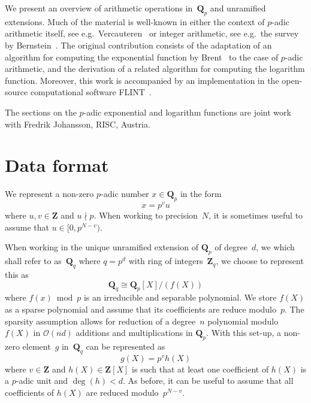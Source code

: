 We present an overview of arithmetic operations in~$\mathbf{Q}_p$ 
and unramified extensions.  Much of the material is well-known in 
either the context of $p$-adic arithmetic itself, see e.g.\ 
Vercauteren~\citep[\S 12]{HEHCC2005} or integer arithmetic, 
see e.g.\ the survey by Bernstein~\citep{Bernstein2008}. 
The original contribution consists of the adaptation of an algorithm 
for computing the exponential function by Brent~\citep{Brent1976} 
to the case of $p$-adic arithmetic, and the derivation of a related 
algorithm for computing the logarithm function.  Moreover, this 
work is accompanied by an implementation in the open-source computational 
software {\sc FLINT}~\citep{FLINT}.

The sections on the $p$-adic exponential and logarithm functions 
are joint work with Fredrik Johansson, RISC, Austria.

\section{Data format}

We represent a non-zero $p$-adic number $x \in \mathbf{Q}_p$ in the form 
\begin{equation}
x = p^v u
\end{equation}
where $u, v \in \mathbf{Z}$ and $u \nmid p$.  When working to precision~$N$, 
it is sometimes useful to assume that $u \in [0,p^{N-v})$.

When working in the unique unramified extension of $\mathbf{Q}_p$ of 
degree~$d$, we which shall refer to as~$\mathbf{Q}_q$ where $q = p^d$ 
with ring of integers~$\mathbf{Z}_q$, we choose to represent this as 
\begin{equation}
\mathbf{Q}_q \cong \mathbf{Q}_p[X] / (f(X))
\end{equation}
where $f(x) \bmod p$ is an irreducible and separable polynomial.  We store 
$f(X)$ as a sparse polynomial and assume that its coefficients are 
reduce modulo~$p$.  The sparsity assumption allows for reduction of a 
degree~$n$ polynomial modulo~$f(X)$ in $\mathcal{O}(nd)$ additions and 
multiplications in $\mathbf{Q}_p$.  With this set-up, a non-zero element~$g$ 
in~$\mathbf{Q}_q$ can be represented as 
\begin{equation}
g(X) = p^v h(X)
\end{equation}
where $v \in \mathbf{Z}$ and $h(X) \in \mathbf{Z}[X]$ is such that at least 
one coefficient of $h(X)$ is a $p$-adic unit and $\deg(h) < d$.  As before, 
it can be useful to assume that all coefficients of $h(X)$ are reduced 
modulo~$p^{N-v}$.


